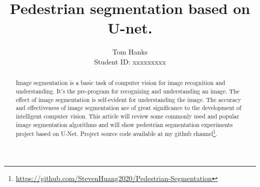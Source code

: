 \documentclass[12pt, a4paper]{article}
\title{Pedestrian segmentation based on U-net.}
\date{}
\author{Tom Hanks \\ Student ID: xxxxxxxxx}
\begin{document}
	\maketitle
 	
	\begin{abstract} \justify %
Image segmentation is a basic task of computer vision for image recognition and understanding. It’s the pre-program for recognizing and understanding an image. The effect of image segmentation is self-evident for understanding the image. The accuracy and effectiveness of image segmentation are of great significance to the development of intelligent computer vision. This article will review some commonly used and popular image segmentation algorithms and will show pedestrian segmentation experiments project based on U-Net. Project source code available at my github channel\footnote{\label{}\url{https://github.com/StevenHuang2020/Pedestrian-Segmentation}}.
	\end{abstract}

	\setlength{\lineskip}{3em}     %
	\setlength{\parskip}{0.5em}     %
\end{document}
